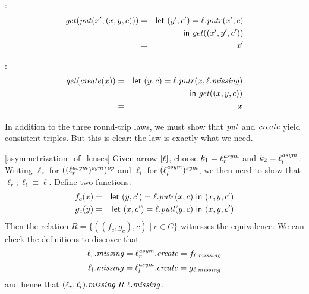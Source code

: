 \begin{defn}[$R$-similarity]
\begin{theorem}
\begin{lemma}
\begin{theorem}[No products]
\begin{lemma}
\begin{defn}
\begin{theorem}
\begin{theorem}
\begin{corollary}[Hylomorphism]
\begin{defn}
\begin{defn}
\begin{defn}[Symmetrization]
\begin{theorem}
\begin{goodlens}
\noindent{}:
\begin{eqnarray*}
    \mathit{get}(\mathit{put}(x',(x,y,c)))
    &=& \mathsf{let}\  (y',c') = \ell.\mathit{putr}(x',c) \\
    & & \mathsf{in}\  \mathit{get}((x',y',c')) \\
    &=& x'
\end{eqnarray*}

\noindent{}:
\begin{eqnarray*}
    \mathit{get}(\mathit{create}(x))
    &=& \mathsf{let}\  (y,c) = \ell.\mathit{putr}(x,\ell.\mathit{missing}) \\
    & & \mathsf{in}\  \mathit{get}((x,y,c)) \\
    &=& x
\end{eqnarray*}

In addition to the three round-trip laws, we must show that $\mathit{put}$ and
$\mathit{create}$ yield consistent triples. But this is clear: the  law
is exactly what we need.
\end{goodlens}
\fi

\begin{pfof}{\ref{asymmetrization_of_lenses}}
Given \iffull arrow \fi $[\ell]$, choose $k_1 = \ell^\mathit{asym}_r$ and $k_2 =
\ell^\mathit{asym}_l$.
\iffull
Writing $\ell_r$ for $((\ell^\mathit{asym}_r)^\mathit{sym})^\mathit{op}$ and $\ell_l$ for
$(\ell^\mathit{asym}_l)^\mathit{sym}$, we then need to show that $\ell_r;\ell_l \equiv \ell$.
Define two functions:
\begin{eqnarray*}
    f_c(x) &=& \mathsf{let}\  (y,c') = \ell.\mathit{putr}(x,c) \ \mathsf{in}\  (x,y,c') \\
    g_c(y) &=& \mathsf{let}\  (x,c') = \ell.\mathit{putl}(y,c) \ \mathsf{in}\  (x,y,c')
\end{eqnarray*}
Then the relation $R = \{((f_c,g_c),c) \mid c \in C\}$ witnesses the
equivalence. We can check the definitions to discover that
\[\ell_r.\mathit{missing} = \ell^\mathit{asym}_r.\mathit{create} = f_{\ell.\mathit{missing}}\]
\[\ell_l.\mathit{missing} = \ell^\mathit{asym}_l.\mathit{create} = g_{\ell.\mathit{missing}}\]
and hence that $(\ell_r;\ell_l).\mathit{missing} \mathrel{R_{}} \ell.\mathit{missing}$.


\end{pfof}
\end{theorem}
\end{defn}
\end{defn}
\end{defn}
\end{corollary}
\end{theorem}
\end{theorem}
\end{defn}
\end{lemma}
\end{theorem}
\end{lemma}
\end{theorem}
\end{defn}

